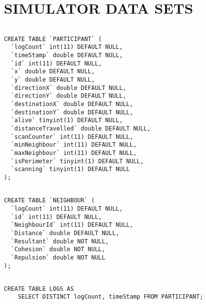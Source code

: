 \chapter{SIMULATOR DATA SETS}\label{app4}

\begin{lstlisting}[label={code:Participant}]  % Start your code-block

CREATE TABLE `PARTICIPANT` (
  `logCount` int(11) DEFAULT NULL,
  `timeStamp` double DEFAULT NULL,
  `id` int(11) DEFAULT NULL,
  `x` double DEFAULT NULL,
  `y` double DEFAULT NULL,
  `directionX` double DEFAULT NULL,
  `directionY` double DEFAULT NULL,
  `destinationX` double DEFAULT NULL,
  `destinationY` double DEFAULT NULL,
  `alive` tinyint(1) DEFAULT NULL,
  `distanceTravelled` double DEFAULT NULL,
  `scanCounter` int(11) DEFAULT NULL,
  `minNeighbour` int(11) DEFAULT NULL,
  `maxNeighbour` int(11) DEFAULT NULL,
  `isPerimeter` tinyint(1) DEFAULT NULL,
  `scanning` tinyint(1) DEFAULT NULL
);
\end{lstlisting}

\begin{lstlisting}[label={code:Neighbour}]  % Start your code-block

CREATE TABLE `NEIGHBOUR` (
  `logCount` int(11) DEFAULT NULL,
  `id` int(11) DEFAULT NULL,
  `NeighbourId` int(11) DEFAULT NULL,
  `Distance` double DEFAULT NULL,
  `Resultant` double NOT NULL,
  `Cohesion` double NOT NULL,
  `Repulsion` double NOT NULL
);
\end{lstlisting}

\begin{lstlisting}[label={code:LOGS}]  % Start your code-block

CREATE TABLE LOGS AS 
	SELECT DISTINCT logCount, timeStamp FROM PARTICIPANT;
\end{lstlisting}

